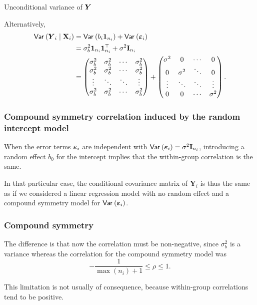 \documentclass{beamer}
\begin{document}
\begin{frame}{Unconditional variance of $\boldsymbol {Y}$}


Alternatively,
\begin{align*}
   {\mathsf{Var}_{}}\left(\boldsymbol {Y}_i \mid \mathbf{X}_i\right) &= {\mathsf{Var}_{}}\left(b_i \boldsymbol {1}_{n_i}\right) + {\mathsf{Var}_{}}\left(\boldsymbol {\varepsilon}_i\right)
   \\&= \sigma^2_b \boldsymbol {1}_{n_i}\boldsymbol {1}_{n_i}^\top + \sigma^2 \mathbf{I}_{n_i}
   \\&= 
   \begin{pmatrix}
 \sigma^2_b &  \sigma^2_b & \cdots & \sigma^2_b \\
  \sigma^2_b &  \sigma^2_b & \cdots & \sigma^2_b \\
 \vdots & \ddots & \ddots & \vdots \\
 \sigma^2_b &  \sigma^2_b & \cdots & \sigma^2_b   
 \end{pmatrix} + \begin{pmatrix}
 \sigma^2 & 0 & \cdots &0\\
 0 & \sigma^2 & \ddots &0\\
 \vdots &\ddots & \ddots & \vdots\\
 0 & 0 & \cdots & \sigma^2
 \end{pmatrix}.
\end{align*}

\end{frame}


\begin{frame}[fragile]
\frametitle{Compound symmetry correlation induced by the random intercept model}
When the error terms $\boldsymbol {\varepsilon}_i$ are independent with ${\mathsf{Var}_{}}\left(\boldsymbol {\varepsilon}_i\right)=\sigma^2\mathbf{I}_{n_i}$, introducing a random effect $b_0$ for the intercept implies that the within-group correlation is the same.

\vp\vp\vp\vp
In that particular case, the conditional covariance matrix of $\boldsymbol{Y}_i$ is thus the same as if we considered a linear regression model with no random effect and a compound symmetry model for ${\mathsf{Var}_{}}\left(\boldsymbol {\varepsilon}_i\right)$.

\end{frame}
\begin{frame}
\frametitle{Compound symmetry}
\bi
\item The difference is that now the correlation must be non-negative, since $\sigma^2_b$ is a variance whereas the correlation for the compound symmetry model was \[-\frac{1}{\max(n_i)+1} \leq \rho \leq 1.\]
\item This limitation is not usually of consequence, because within-group correlations tend to be positive.

\ei
\end{frame}
\end{document}
